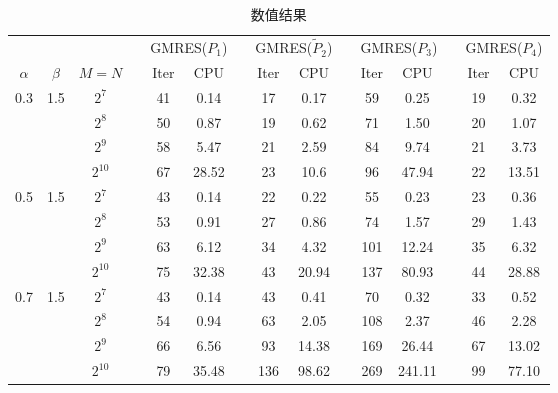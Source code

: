 \documentclass{ecnumaster}
\begin{document}
\begin{table}[H]
\centering
\caption{数值结果} \label{tab4-4-2}
\begin{tabular}{ccccccccccccccc} \toprule
& &  && \multicolumn{2}{c}{GMRES($P_1$)}
&& \multicolumn{2}{c}{GMRES($\tilde{P}_2$)}
&& \multicolumn{2}{c}{GMRES($P_3$)}
&& \multicolumn{2}{c}{GMRES($P_4$)} \\
$\alpha$ & $\beta$ & $M = N$ && Iter & CPU && Iter & CPU
&& Iter & CPU && Iter & CPU \\ \midrule
0.3 & 1.5
 & $2^7$    && 41 &0.14   && 17 & 0.17  && 59 & 0.25   && 19 & 0.32   \\
&& $2^8$    && 50 &0.87   && 19 & 0.62  && 71 & 1.50   && 20 & 1.07   \\
&& $2^9$    && 58 &5.47   && 21 & 2.59  && 84 & 9.74   && 21 & 3.73   \\
&& $2^{10}$ && 67 &28.52  && 23 & 10.6  && 96 & 47.94  && 22 & 13.51  \\  \midrule
0.5 & 1.5
 & $2^7$    && 43 &0.14   && 22 & 0.22  && 55 & 0.23   && 23 & 0.36    \\
&& $2^8$    && 53 &0.91   && 27 & 0.86  && 74 & 1.57   && 29 & 1.43    \\
&& $2^9$    && 63 &6.12   && 34 & 4.32  && 101 & 12.24 && 35 & 6.32    \\
&& $2^{10}$ && 75 &32.38  && 43 & 20.94 && 137 & 80.93 && 44 & 28.88   \\ \midrule
0.7 & 1.5
 & $2^7$    && 43 &0.14   && 43 & 0.41  && 70 & 0.32   && 33 & 0.52    \\
&& $2^8$    && 54 &0.94   && 63 & 2.05  && 108 & 2.37  && 46 & 2.28    \\
&& $2^9$    && 66 &6.56   && 93 & 14.38 && 169 & 26.44 && 67 & 13.02   \\
&& $2^{10}$ && 79 &35.48  && 136& 98.62 && 269 & 241.11&& 99 & 77.10   \\ \bottomrule
\end{tabular}
\end{table}
\end{document}
